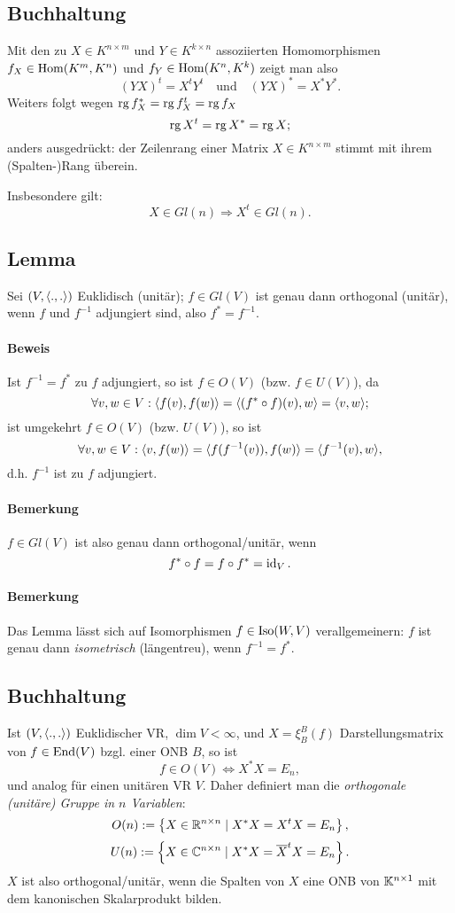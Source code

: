 \subsection{Buchhaltung}
	Mit den zu $ X\in K^{n\times m} $ und $ Y\in K^{k\times n} $ assoziierten Homomorphismen $ f_X\in \operatorname{Hom}(K^m,K^n) $ und $ f_Y\in \operatorname{Hom}(K^n,K^k) $ zeigt man also
		\[ (YX)^t = X^tY^t \quad\text{und}\quad (YX)^* = X^*Y^*. \]
	Weiters folgt wegen $ \operatorname{rg} f_X^* = \operatorname{rg} f_X^t = \operatorname{rg} f_X $
		\[ \operatorname{rg} X^t = \operatorname{rg} X^* = \operatorname{rg} X; \]
	anders ausgedrückt: der Zeilenrang einer Matrix $ X\in K^{n\times m} $ stimmt mit ihrem (Spalten-)Rang überein.
	
	Insbesondere gilt:
		\[ X\in Gl(n) \Rightarrow X^t \in Gl(n). \]
		
\subsection{Lemma}
\begin{Lemma}[]
	Sei $ (V,\langle .,. \rangle) $ Euklidisch (unitär); $ f\in Gl(V) $ ist genau dann orthogonal (unitär), wenn $ f $ und $ f^{-1} $ adjungiert sind, also $  f^*=f^{-1} $.
\end{Lemma}
\paragraph{Beweis}
	Ist $ f^{-1}=f^* $ zu $ f $ adjungiert, so ist $ f\in O(V) $ (bzw. $ f\in U(V) $), da
		\[ \forall v,w\in V: \langle f(v),f(w) \rangle = \langle (f^*\circ f)(v),w \rangle = \langle v,w \rangle; \]
	ist umgekehrt $ f\in O(V) $ (bzw. $ U(V) $), so ist
		\[ \forall v,w\in V: \langle v,f(w) \rangle = \langle f(f^{-1}(v)),f(w) \rangle = \langle f^{-1}(v),w \rangle, \]
	d.h. $ f^{-1} $ ist zu $ f $ adjungiert.
\paragraph{Bemerkung}
	$ f\in Gl(V) $ ist also genau dann orthogonal/unitär, wenn
		\[ f^*\circ f = f\circ f^* = \operatorname{id}_V. \]
\paragraph{Bemerkung}
	Das Lemma lässt sich auf Isomorphismen $ f\in \operatorname{Iso}(W,V) $ verallgemeinern:
	$ f $ ist genau dann \emph{isometrisch} (längentreu), wenn $ f^{-1} = f^* $.

\subsection{Buchhaltung}
	Ist $ (V,\langle .,. \rangle) $ Euklidischer VR, $ \dim V <\infty $,
	und $ X=\xi_B^B(f) $ Darstellungsmatrix von $ f\in \operatorname{End}(V) $ bzgl. einer ONB $ B $,
	so ist
		\[ f\in O(V)\Leftrightarrow X^*X = E_n, \]
	und analog für einen unitären VR $ V $.
	Daher definiert man die \emph{orthogonale (unitäre) Gruppe in $ n $ Variablen}:
		\[ O(n) := \left\{X\in \mathbb{R}^{n\times n}\mid X^*X = X^tX = E_n \right\}, \]
		\[ U(n) := \left\{X\in \mathbb{C}^{n\times n}\mid X^*X = \overline{X}^tX = E_n\right\}.\]
	$ X $ ist also orthogonal/unitär, wenn die Spalten von $ X $ eine ONB von $ \mathbb{K}^{n\times 1} $ mit dem kanonischen Skalarprodukt bilden.

